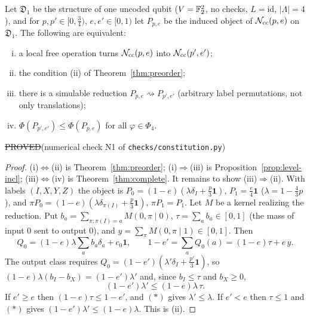 \begin{proposition}\label{prop:local-level1}
Let $\mathfrak D_1$ be the structure of one uncoded qubit ($V=\mathbb{F}_2^2$, no checks, $L=\mathrm{id}$, $|\Lambda|=4$), and for $p,p'\in[0,\tfrac34)$, $e,e'\in[0,1)$ let $P_{p,e}$ be the induced object of $\mathcal{N}_{\rm cc}(p,e)$ on $\mathfrak D_1$. The following are equivalent:
\begin{enumerate}[(i)]
\item a local free operation turns $\mathcal{N}_{\rm cc}(p,e)$ into $\mathcal{N}_{\rm cc}(p',e')$;
\item the condition (ii) of Theorem~\ref{thm:preorder};
\item there is a simulable reduction $P_{p,e}\rightsquigarrow P_{p',e'}$ (arbitrary label permutations, not only translations);
\item $\Phi(P_{p',e'})\le\Phi(P_{p,e})$ for all $\varphi\in\Phi_4$.
\end{enumerate}
\hfill\st{PROVED}\quad(numerical check N1 of \texttt{checks/constitution.py})
\end{proposition}
\begin{proof}
(i)$\Leftrightarrow$(ii) is Theorem~\ref{thm:preorder}; (i)$\Rightarrow$(iii) is Proposition~\ref{prop:level-incl}; (iii)$\Leftrightarrow$(iv) is Theorem~\ref{thm:complete}. It remains to show (iii)$\Rightarrow$(ii).
With labels $(I,X,Y,Z)$ the object is $P_0=(1-e)(\lambda\delta_I+\tfrac p3\mathbf 1)$, $P_1=\tfrac e4\mathbf 1$ ($\lambda=1-\tfrac43p$), and $\pi P_0=(1-e)(\lambda\delta_{\pi(I)}+\tfrac p3\mathbf 1)$, $\pi P_1=P_1$.
Let $M$ be a kernel realizing the reduction. Put $b_a=\sum_{\pi:\pi(I)=a}M(0,\pi\mid0)$, $\tau=\sum_ab_a\in[0,1]$ (the mass of input $0$ sent to output $0$), and $y=\sum_\pi M(0,\pi\mid1)\in[0,1]$. Then
\[
Q_0=(1-e)\lambda\sum_ab_a\delta_a+c_0\mathbf 1,\qquad 1-e'=\textstyle\sum_aQ_0(a)=(1-e)\tau+e\,y .
\]
The output class requires $Q_0=(1-e')(\lambda'\delta_I+\tfrac{p'}3\mathbf 1)$, so $(1-e)\lambda(b_I-b_X)=(1-e')\lambda'$ and, since $b_I\le\tau$ and $b_X\ge0$,
\[
(1-e')\lambda'\le(1-e)\lambda\,\tau.\tag{$*$}
\]
If $e'\ge e$ then $(1-e)\tau\le1-e'$, and $(*)$ gives $\lambda'\le\lambda$. If $e'<e$ then $\tau\le1$ and $(*)$ gives $(1-e')\lambda'\le(1-e)\lambda$. This is (ii).
\end{proof}

